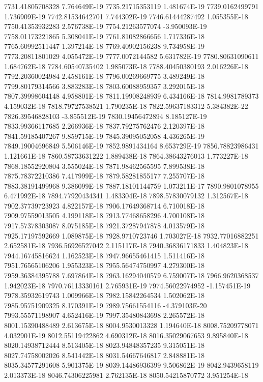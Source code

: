 7731.41805708328  7.764649E-19
7735.21715353119  1.481674E-19
7739.0162499791  1.736909E-19
7742.81534642701  7.744302E-19
7746.61444287492  1.055355E-18
7750.41353932283  2.576738E-19
7754.21263577074  -3.950093E-19
7758.01173221865  5.308041E-19
7761.81082866656  1.717336E-18
7765.60992511447  1.397214E-18
7769.40902156238  9.734958E-19
7773.20811801029  4.055472E-19
7777.0072144582  5.631782E-19
7780.80631090611  1.684762E-18
7784.60540735402  1.985073E-18
7788.40450380193  2.016226E-18
7792.20360024984  2.458161E-18
7796.00269669775  3.489249E-18
7799.80179314566  3.883283E-18
7803.60088959357  3.292015E-18
7807.39998604148  4.958801E-18
7811.19908248939  6.434166E-18
7814.9981789373  4.159032E-18
7818.79727538521  1.790235E-18
7822.59637183312  5.384382E-22
7826.39546828103  -3.855512E-19
7830.19456472894  8.185127E-19
7833.99366117685  2.266936E-18
7837.79275762476  2.120397E-18
7841.59185407267  9.859715E-19
7845.39095052058  4.436265E-19
7849.19004696849  5.506146E-19
7852.9891434164  8.653729E-19
7856.78823986431  1.121661E-18
7860.58733631222  1.889438E-18
7864.38643276013  1.773227E-18
7868.18552920804  3.555024E-18
7871.98462565595  7.899538E-18
7875.78372210386  7.417999E-18
7879.58281855177  7.255707E-18
7883.38191499968  9.386099E-18
7887.18101144759  1.073211E-17
7890.9801078955  6.471992E-18
7894.77920434341  1.483304E-18
7898.57830079132  1.312567E-18
7902.37739723923  4.822157E-18
7906.17649368714  6.710018E-18
7909.97559013505  4.199118E-18
7913.77468658296  4.700108E-18
7917.57378303087  8.075185E-18
7921.37287947878  4.013579E-18
7925.17197592669  1.089875E-18
7928.9710723746  1.703027E-18
7932.77016882251  2.652581E-18
7936.56926527042  2.115117E-18
7940.36836171833  1.404823E-18
7944.16745816624  1.162523E-18
7947.96655461415  1.511416E-18
7951.76565106206  1.955323E-18
7955.56474750997  4.279300E-18
7959.36384395788  7.697864E-18
7963.16294040579  6.759007E-18
7966.9620368537  1.942023E-18
7970.76113330161  2.765931E-19
7974.56022974952  -1.157451E-19
7978.35932619743  1.009966E-18
7982.15842264534  1.502062E-18
7985.95751909325  8.170391E-19
7989.75661554116  -4.379103E-20
7993.55571198907  4.652416E-19
7997.35480843698  2.265572E-18
8001.15390488489  2.613675E-18
8004.9530013328  1.194640E-18
8008.75209778071  4.032901E-19
8012.55119422862  4.690312E-18
8016.35029067653  9.895840E-18
8020.14938712444  8.513405E-18
8023.94848357235  9.315051E-18
8027.74758002026  8.541442E-18
8031.54667646817  2.848881E-18
8035.34577291608  5.901375E-19
8039.14486936399  9.506862E-19
8042.9439658119  2.013373E-18
8046.74306225981  2.762135E-18
8050.54215870772  3.951254E-18
